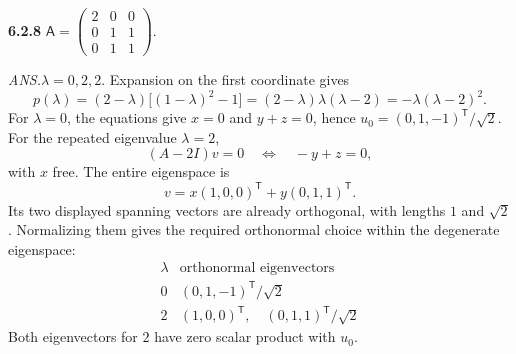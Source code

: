 \par\bigskip
\noindent\textbf{6.2.8}\quad
$\mathsf{A}=\begin{pmatrix}2&0&0\\0&1&1\\0&1&1\end{pmatrix}$.
\par\nobreak\hfill\emph{ANS.}\enspace $\lambda=0,2,2$.
\solution
Expansion on the first coordinate gives
\[
p(\lambda)=(2-\lambda)\bigl[(1-\lambda)^2-1\bigr]
=(2-\lambda)\lambda(\lambda-2)
=-\lambda(\lambda-2)^2.
\]
For $\lambda=0$, the equations give $x=0$ and $y+z=0$, hence
$u_0=(0,1,-1)^{\mathsf T}/\sqrt2$.
For the repeated eigenvalue $\lambda=2$,
\[
(A-2I)v=0\quad\Longleftrightarrow\quad -y+z=0,
\]
with $x$ free. The entire eigenspace is
\[
v=x(1,0,0)^{\mathsf T}+y(0,1,1)^{\mathsf T}.
\]
Its two displayed spanning vectors are already orthogonal, with lengths
$1$ and $\sqrt2$. Normalizing them gives the required orthonormal
choice within the degenerate eigenspace:
\[
\boxed{\begin{array}{c|c}
\lambda&\text{orthonormal eigenvectors}\\\hline
0&(0,1,-1)^{\mathsf T}/\sqrt2\\
2&(1,0,0)^{\mathsf T},\quad(0,1,1)^{\mathsf T}/\sqrt2
\end{array}}
\]
Both eigenvectors for $2$ have zero scalar product with $u_0$.

